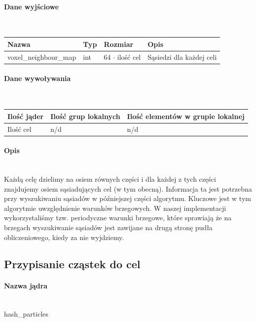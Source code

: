 \documentclass[polish, 12pt]{aghthesis}
\begin{document}
			\paragraph{Dane wyjściowe} \ \\
				\begin{tabular}{| p{} | p{} | p{} | p{} |}
				\hline
					Nazwa & Typ & Rozmiar & Opis \\
				\hline
					voxel\_neighbour\_map & int & 64 ${\cdot}$ ilość cel & Sąsiedzi dla każdej celi \\ 
				\hline
				\end{tabular}
			\paragraph{Dane wywoływania} \ \\
					\begin{tabular}{| p{} | p{} | p{}|}
					\hline
						Ilość jąder & Ilość grup lokalnych & Ilość elementów w grupie lokalnej \\
					\hline
						Ilość cel & n/d & n/d \\ 
					\hline
    				\end{tabular}
			\paragraph{Opis} \ \\
				\indent Każdą celę dzielimy na osiem równych części i dla każdej z tych części znajdujemy osiem sąsiadujących cel (w tym obecną). Informacja ta jest potrzebna przy wyszukiwaniu sąsiadów w późniejszej części algorytmu. Kluczowe jest w tym algorytmie uwzględnienie warunków brzegowych. W naszej implementacji wykorzystaliśmy tzw. periodyczne warunki brzegowe, które sprawiają że na brzegach wyszukiwanie sąsiadów jest zawijane na drugą stronę pudła obliczeniowego, kiedy za nie wyjdziemy.
				
		\subsection{Przypisanie cząstek do cel}
			\paragraph{Nazwa jądra} \ \\
				hash\_particles
\end{document}
